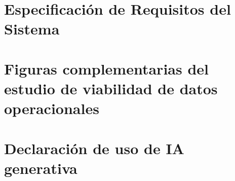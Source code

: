 \documentclass[12pt]{report} %
\begin{document}
\chapter{Especificación de Requisitos del Sistema}\label{anex:requirements}


\chapter{Figuras complementarias del estudio de viabilidad de datos operacionales}\label{anex:figures}


\chapter{Declaración de uso de IA generativa}\label{anex:iag}

\end{document}
